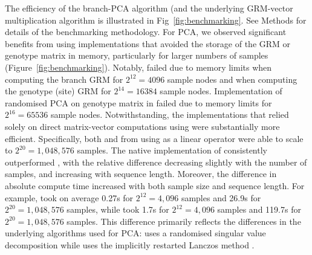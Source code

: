 The efficiency of the branch-PCA algorithm (and the underlying GRM-vector multiplication algorithm is illustrated in Fig~\ref{fig:benchmarking}. 
See Methods for details of the benchmarking methodology.
For PCA, we observed significant benefits from using implementations that avoided the storage of the GRM or genotype matrix in memory,
particularly for larger numbers of samples (Figure~\ref{fig:benchmarking}).
%
Notably, \tsGRM{} failed due to memory limits
when computing the branch GRM for $2^{12} = 4096$ sample nodes and
when computing the genotype (site) GRM for $2^{14} = 16384$ sample nodes.
%
Implementation of randomised PCA on genotype matrix in \scikitallel{}
failed due to memory limits for $2^{16} = 65536$ sample nodes.
%
Notwithstanding, the implementations that relied solely on
direct matrix-vector computations using \tskit{} were substantially more efficient.
%
Specifically, both \tsPCA{} and \eigsh{} from \scipy{} using \tsGRw{}
as a linear operator were able to scale to $2^{20} = 1,048,576$ samples.
%
The native implementation of \tsPCA{} consistently outperformed \eigsh{},
with the relative difference decreasing slightly with the number of samples, and increasing with sequence length.
%
Moreover, the difference in absolute compute time increased with both sample size and sequence length.
%
For example, \tsPCA{} took on average
0.27s for $2^{12} = 4,096$ samples and
26.9s for $2^{20} = 1,048,576$ samples,
while \eigsh{} took
  1.7s for $2^{12} = 4,096$ samples and
119.7s for $2^{20} = 1,048,576$ samples.
%
This difference primarily reflects the differences in the underlying algorithms used for PCA:
\tsPCA{} uses a randomised singular value decomposition while \eigsh{} uses the implicitly restarted Lanczos method \citep{lehoucq1998arpack}.
